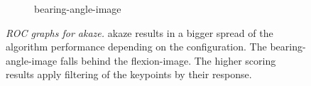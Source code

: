 \begin{figure}[H]
\begin{subfigure}[t]{0.45\linewidth}
    \caption{\gls{bearing-angle-image}}
\end{subfigure}
    \caption[\acrshort{ROC} graphs for \acrshort{akaze}]{\emph{\acrshort{ROC} graphs for \acrshort{akaze}.} \acrshort{akaze} results in a bigger spread of the algorithm performance depending on the configuration. The \acrshort{bearing-angle-image} falls behind the \gls{flexion-image}. The higher scoring results apply filtering of the keypoints by their response.}\label{fig:roc_akaze}
\end{figure}
